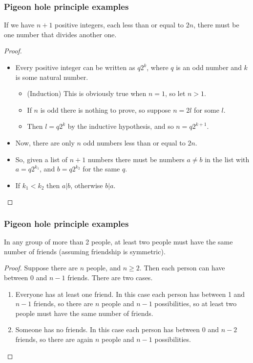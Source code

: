 \documentclass[handout]{beamer}
\begin{document}
\begin{frame}
\frametitle{Pigeon hole principle examples}
\begin{example}
If we have $n+1$ positive integers, each less than or equal to $2n$, there must be one number that divides another one.
\end{example}
\begin{proof}
\begin{itemize}
\item Every positive integer can be written as $q2^k$, where $q$ is an odd number and $k$ is some natural number. 
\begin{itemize}
\item (Induction) This is obviously true when $n=1$, so let $n>1$.  
\item If $n$ is odd there is nothing to prove, so suppose $n = 2l$ for some $l$. 
\item Then $l=q2^k$ by the inductive hypothesis, and so $n=q2^{k+1}$. 
\end{itemize}
\item Now, there are only $n$ odd numbers less than or equal to $2n$. 
\item So, given a list of $n+1$ numbers there must be numbers $a\neq b$ in the list with $a=q2^{k_1}$, and $b= q2^{k_2}$ for the same $q$. 
\item If $k_1< k_2$ then $a|b$, otherwise $b|a$. 
\end{itemize}
\end{proof}
\end{frame}

\begin{frame}
\frametitle{Pigeon hole principle examples}
\begin{example}
In any group of more than 2 people, at least two people must have the same number of friends (assuming friendship is symmetric). 
\end{example}
\begin{proof}
Suppose there are $n$ people, and $n\geq 2$. Then each person can have between 0 and $n-1$ friends. There are two cases.
\begin{enumerate}
\item Everyone has at least one friend. In this case each person has between 1 and $n-1$ friends, so there are $n$ people and $n-1$ possibilities, so at least two people must have the same number of friends.
\item Someone has no friends. In this case each person has between 0 and $n-2$ friends, so there are again $n$ people and $n-1$ possibilities.
\end{enumerate}
\end{proof}
\end{frame}
\end{document}
